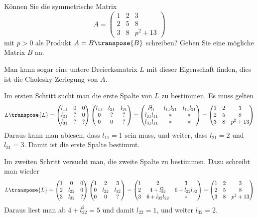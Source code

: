 Können Sie die symmetrische Matrix
\[
A=\begin{pmatrix}
 1&2&3\\
 2&5&8\\
 3&8&p^2 + 13
\end{pmatrix}
\]
mit $p>0$ als Produkt $A=B\transpose{B}$ schreiben?
Geben Sie eine mögliche Matrix $B$ an.


\begin{loesung}
Man kann sogar eine untere Dreiecksmatrix $L$ mit dieser Eigenschaft finden,
dies ist die Cholesky-Zerlegung von $A$.

Im ersten Schritt sucht man die erste Spalte von $L$ zu bestimmen.
Es muss gelten
\[
L\transpose{L}=
\begin{pmatrix}
l_{11}&  0&  0\\
l_{21}&  ?&  0\\
l_{31}&  ?&  ?
\end{pmatrix}
\begin{pmatrix}
l_{11}&l_{21}&l_{31}\\
     0&     ?&     ?\\
     0&     0&     ?
\end{pmatrix}
=
\begin{pmatrix}
    l_{11}^2&l_{11}l_{21}&l_{11}l_{31}\\
l_{21}l_{11}&           *&           *\\
l_{31}l_{11}&           *&           *
\end{pmatrix}
=
\begin{pmatrix}
 1&2&3\\
 2&5&8\\
 3&8&p^2 + 13
\end{pmatrix}
\]
Daraus kann man ablesen, dass $l_{11}=1$ sein muss, und weiter,
dass
$l_{21}=2$ und $l_{31}=3$. Damit ist die erste Spalte bestimmt.

Im zweiten Schritt versucht man, die zweite Spalte zu bestimmen.
Dazu schreibt man wieder
\[
L\transpose{L}
=
\begin{pmatrix}
1&     0&0\\
2&l_{22}&0\\
3&l_{32}&?
\end{pmatrix}
\begin{pmatrix}
1&     2&     3\\
0&l_{22}&l_{32}\\
0&     0&?
\end{pmatrix}
=
\begin{pmatrix}
 1&              2&             3\\
 2& 4+l_{22}^2    & 6+l_{22}l_{32}\\
 3& 6+l_{32}l_{22}&             *
\end{pmatrix}
=
\begin{pmatrix}
 1&2&3\\
 2&5&8\\
 3&8&p^2 + 13
\end{pmatrix}
\]
Daraus liest man ab $4+l_{22}^2=5$ und damit $l_{22}=1$, und weiter
$l_{32}=2$.


\end{loesung}
